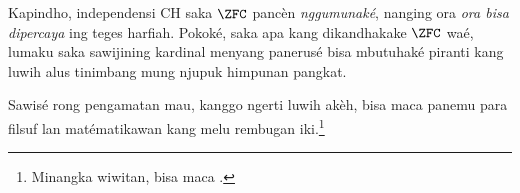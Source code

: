 \documentclass[../../../include/open-logic-section]{subfiles}
\begin{document}
Kapindho, independensi CH saka $\ZFC$ pancèn
\emph{nggumunaké}, nanging ora \emph{ora bisa dipercaya} ing teges
harfiah. Pokoké, saka apa kang dikandhakake $\ZFC$ waé,
lumaku saka sawijining kardinal menyang panerusé bisa mbutuhaké
piranti kang luwih alus tinimbang mung njupuk himpunan pangkat.

Sawisé rong pengamatan mau, kanggo ngerti luwih akèh, bisa maca
panemu para filsuf lan matématikawan kang melu rembugan iki.\footnote{Minangka wiwitan, bisa maca
\citet[\S15.6]{Potter2004}.}
\end{document}
